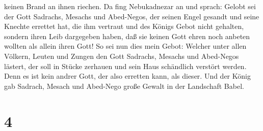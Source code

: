 keinen Brand an ihnen riechen.  Da fing Nebukadnezar an und
sprach: Gelobt sei der Gott Sadrachs, Mesachs und Abed-Negos, der seinen
Engel gesandt und seine Knechte errettet hat, die ihm vertraut und des
Königs Gebot nicht gehalten, sondern ihren Leib dargegeben haben, daß
sie keinen Gott ehren noch anbeten wollten als allein ihren Gott!
 So sei nun dies mein Gebot: Welcher unter allen Völkern,
Leuten und Zungen den Gott Sadrachs, Mesachs und Abed-Negos lästert, der
soll in Stücke zerhauen und sein Haus schändlich verstört werden. Denn
es ist kein andrer Gott, der also erretten kann, als dieser.
 Und der König gab Sadrach, Mesach und Abed-Nego große
Gewalt in der Landschaft Babel.

\hypertarget{section-3}{%
\section{4}\label{section-3}}

